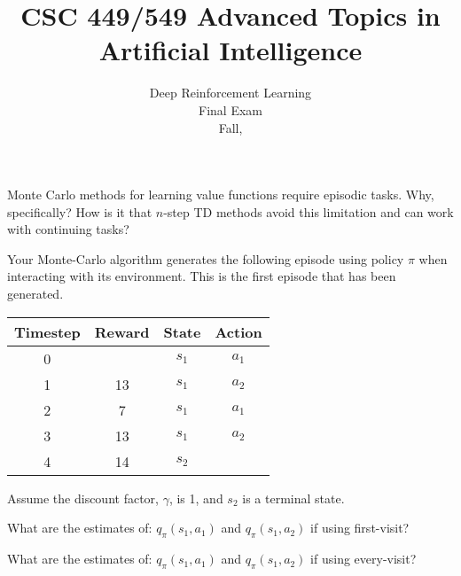 \documentclass[12pt]{exam}
\title{CSC 449/549 Advanced Topics in Artificial Intelligence}
\date{Deep Reinforcement Learning\\Final Exam\\Fall, \the\year}
\newif\ifanswers
\begin{document}
\maketitle


\newlength{\mytabcolsep}
\setlength{\mytabcolsep}{0.75pt}
\newlength{\zerowidth}
\settowidth{\zerowidth}{0}
\newlength{\normaltabcolsep}
\setlength{\normaltabcolsep}{\tabcolsep}


 
\begin{question}{10}
Monte Carlo methods for learning value functions require episodic tasks. Why, specifically? How is it that $n$-step TD methods avoid this limitation and can work with continuing tasks?
  \begin{minipage}[t][2.5in]{\linewidth}
    \ifanswers
    Put answer here
    \fi
  \end{minipage}

\end{question}

\begin{question}{20}
Your Monte-Carlo algorithm generates the following episode using
policy $\pi$ when interacting with its environment. This is the first
episode that has been generated.
\begin{center}
  \begin{tabular}{|c|c|c|c|}
    \hline
    Timestep & Reward & State & Action\\
    \hline
    \hline
0 & & $s_1$ & $a_1$ \\
    \hline
1 & 13 & $s_1$ & $a_2$ \\
    \hline
2 & 7 & $s_1$ & $a_1$ \\
    \hline
3 & 13 & $s_1$ & $a_2$ \\
    \hline
4 & 14 & $s_2$ &  \\
    \hline
  \end{tabular}
\end{center}
Assume the discount factor, $\gamma$, is 1, and $s_2$ is a terminal state.
\begin{subquestion}
  What are the estimates of: $q_\pi(s_1, a_1)$ and $q_\pi(s_1, a_2)$ if using first-visit?
  \begin{minipage}[t][2in]{\linewidth}
    \ifanswers
    Put answer here
    \fi
  \end{minipage}
\end{subquestion}
\begin{subquestion}
  What are the estimates of: $q_\pi(s_1, a_1)$ and $q_\pi(s_1, a_2)$ if using every-visit?
  \begin{minipage}[t][2in]{\linewidth}
    \ifanswers
    Put answer here
    \fi
  \end{minipage}
\end{subquestion}

\end{question}
\end{document}
